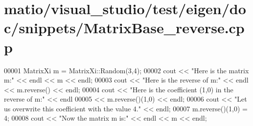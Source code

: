 \hypertarget{matio_2visual__studio_2test_2eigen_2doc_2snippets_2_matrix_base__reverse_8cpp_source}{}\section{matio/visual\+\_\+studio/test/eigen/doc/snippets/\+Matrix\+Base\+\_\+reverse.cpp}
\label{matio_2visual__studio_2test_2eigen_2doc_2snippets_2_matrix_base__reverse_8cpp_source}

\begin{DoxyCode}
00001 MatrixXi m = MatrixXi::Random(3,4);
00002 cout << \textcolor{stringliteral}{"Here is the matrix m:"} << endl << m << endl;
00003 cout << \textcolor{stringliteral}{"Here is the reverse of m:"} << endl << m.reverse() << endl;
00004 cout << \textcolor{stringliteral}{"Here is the coefficient (1,0) in the reverse of m:"} << endl
00005      << m.reverse()(1,0) << endl;
00006 cout << \textcolor{stringliteral}{"Let us overwrite this coefficient with the value 4."} << endl;
00007 m.reverse()(1,0) = 4;
00008 cout << \textcolor{stringliteral}{"Now the matrix m is:"} << endl << m << endl;
\end{DoxyCode}
